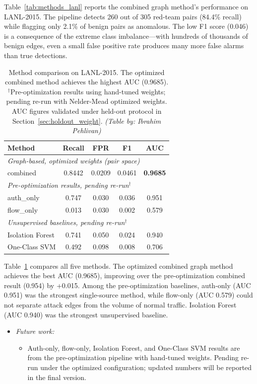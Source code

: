 \documentclass[letterpaper,twocolumn,10pt]{article}
\begin{document}
Table~\ref{tab:methods_lanl} reports the combined graph method's performance on LANL-2015. The pipeline detects 260 out of 305 red-team pairs (84.4\% recall) while flagging only 2.1\% of benign pairs as anomalous. The low F1 score (0.046) is a consequence of the extreme class imbalance---with hundreds of thousands of benign edges, even a small false positive rate produces many more false alarms than true detections.

\begin{table}[h]
\centering
\begin{tabular}{lcccc}
\hline
Method & Recall & FPR & F1 & AUC \\
\hline
\multicolumn{5}{l}{\textit{Graph-based, optimized weights (pair space)}} \\
combined              & 0.8442 & 0.0209 & 0.0461 & \textbf{0.9685} \\
\hline
\multicolumn{5}{l}{\textit{Pre-optimization results, pending re-run$^\dagger$}} \\
auth\_only            & 0.747 & 0.030 & 0.036 & 0.951 \\
flow\_only            & 0.013 & 0.030 & 0.002 & 0.579 \\
\hline
\multicolumn{5}{l}{\textit{Unsupervised baselines, pending re-run$^\dagger$}} \\
Isolation Forest      & 0.741 & 0.050 & 0.024 & 0.940 \\
One-Class SVM         & 0.492 & 0.098 & 0.008 & 0.706 \\
\hline
\end{tabular}
\caption{Method comparison on LANL-2015. The optimized combined method achieves the highest AUC (0.9685). $^\dagger$Pre-optimization results using hand-tuned weights; pending re-run with Nelder-Mead optimized weights. AUC figures validated under held-out protocol in Section~\ref{sec:holdout_weight}. \textit{(Table by: Ibrahim Pehlivan)}}
\label{tab:methods_comparison}
\end{table}

Table~\ref{tab:methods_comparison} compares all five methods. The optimized combined graph method achieves the best AUC (0.9685), improving over the pre-optimization combined result (0.954) by +0.015. Among the pre-optimization baselines, auth-only (AUC 0.951) was the strongest single-source method, while flow-only (AUC 0.579) could not separate attack edges from the volume of normal traffic. Isolation Forest (AUC 0.940) was the strongest unsupervised baseline.

\begin{itemize}
\item \textit{Future work:}
\begin{itemize}
\item Auth-only, flow-only, Isolation Forest, and One-Class SVM results are from the pre-optimization pipeline with hand-tuned weights. Pending re-run under the optimized configuration; updated numbers will be reported in the final version.
\end{itemize}
\end{itemize}
\end{document}
